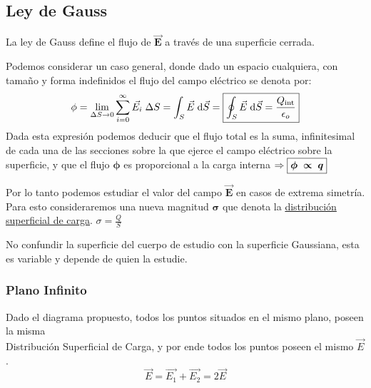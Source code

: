 \subsection{Ley de Gauss}
\begin{wrapfigure}{r}{3cm}
        
\end{wrapfigure}
\noindent La ley de Gauss define el flujo de \(\bm{\vec{E}}\) a través de una superficie cerrada.\par
\noindent Podemos considerar un caso general, donde dado un espacio cualquiera, con tamaño y forma indefinidos el flujo del campo eléctrico se denota por:
\[
        \phi =\lim_{\Delta S \to 0}\sum_{i=0}^{\infty}\vec{E_i}\hspace{1mm}\Delta S = \int_{S}\vec{E}\hspace{1mm}\mathrm{d} \vec{S} = \boxed{\oint_{S} \vec{E} \hspace{1mm}\mathrm{d} \vec{S} = \frac{Q_\textnormal{int}}{\epsilon_o}}
\]
Dada esta expresión podemos deducir que el flujo total es la suma, infinitesimal de cada una de las secciones sobre la que ejerce el campo eléctrico sobre la superficie, y que el flujo \(\bm{\phi}\) es proporcional a la carga interna \(\Rightarrow \boxed{\bm{\phi} \hspace{1mm} \bm{\propto} \hspace{1mm} \bm{q}}\) \par
\vspace{1cm}
\hspace{-.5cm}
Por lo tanto podemos estudiar el valor del campo \(\bm{\vec{E}}\) en casos de extrema simetría.
Para esto consideraremos una nueva magnitud \(\bm{\sigma}\) que denota la \underline{distribución superficial de carga}. \(\boxed{\sigma = \frac{Q}{S}}\)
\par \vspace{.5cm} \hspace{-.5cm}No confundir la superficie del cuerpo de estudio con la superficie Gaussiana, esta es variable y depende de quien la estudie.
\subsubsection{Plano Infinito}
\par
\noindent Dado el diagrama propuesto, todos los puntos situados en el mismo plano, poseen la misma \\Distribución Superficial de Carga, y por ende todos los puntos poseen el mismo \(\vec{E}\).
\[\vec{E} = \vec{E_1} + \vec{E_2} = 2\vec{E}\]
